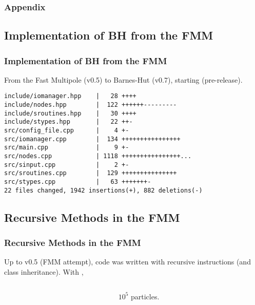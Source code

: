 \appendix
{}

\begin{frame}
	\frametitle{Appendix}
	\tableofcontents
\end{frame}

\begin{frame}[fragile=singleslide]
\section{Implementation of BH from the FMM}
\frametitle{Implementation of BH from the FMM}
From the Fast Multipole (v0.5) to Barnes-Hut (v0.7), starting  (pre-release).
\begin{lstlisting}
include/iomanager.hpp    |   28 ++++
include/nodes.hpp        |  122 ++++++---------
include/sroutines.hpp    |   30 ++++
include/stypes.hpp       |   22 ++-
src/config_file.cpp      |    4 +-
src/iomanager.cpp        |  134 ++++++++++++++++
src/main.cpp             |    9 +-
src/nodes.cpp            | 1118 ++++++++++++++++...
src/sinput.cpp           |    2 +-
src/sroutines.cpp        |  129 +++++++++++++++
src/stypes.cpp           |   63 +++++++-
22 files changed, 1942 insertions(+), 882 deletions(-)
\end{lstlisting}
\end{frame}

\begin{frame}[t]
	\section{Recursive Methods in the FMM}
	\frametitle{Recursive Methods in the FMM}
	Up to v0.5 (FMM attempt), code was written with recursive instructions (and class inheritance). With \only<2>{\lstinline|O3|},
	\begin{columns}
		\begin{column}{0.7\textwidth}
			\only<1>{}
			\only<2>{}
		\end{column}
		\begin{column}{0.3\textwidth}
			$10^5$ particles.
			
			
		\end{column}
	\end{columns}
\end{frame}

